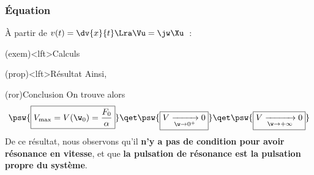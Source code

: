 \documentclass[../../main/main.tex]{subfiles}
\begin{document}
\subsubsection{Équation}

À partir de $v(t) = \dv{x}{t} \Lra \Vu = \jw\Xu$~:
\begin{tcb}(exem)<lft>{Calculs}
	\vspace{-15pt}
\end{tcb}
\begin{tcb}(prop)<lft>{Résultat}
	Ainsi,
	\vspace{-15pt}
\end{tcb}
\begin{tcb}(ror){Conclusion}
	On trouve alors
	\[
		\psw{
			\boxed{
				V_{\max} = V(\w_0) = \frac{F_0}{\alpha}
			}
		}
		\qet
		\psw{
			\boxed{
				V\xrightarrow[\w\to0^+]{} 0
			}
		}
		\qet
		\psw{
			\boxed{
				V\xrightarrow[\w\to+\infty]{} 0
			}
		}
	\]
	De ce résultat, nous observons qu'il \textbf{n'y a pas de condition pour avoir
		résonance en vitesse}, et que \textbf{la pulsation de résonance est la
		pulsation propre du système}.
\end{tcb}

\vspace{-15pt}
\end{document}
